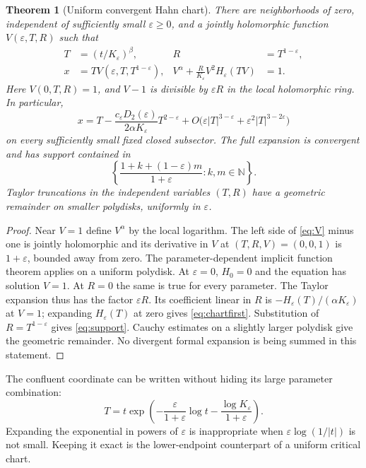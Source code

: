 \documentclass[11pt,a4paper]{article}
\newtheorem{theorem}{Theorem}[section]
\theoremstyle{definition}\newtheorem{definition}[theorem]{Definition}
\theoremstyle{remark}\newtheorem{remark}[theorem]{Remark}
\newcommand{\eps}{\varepsilon}
\newcommand{\N}{\mathbb N}
\newcommand{\1}{\mathbf 1}
\begin{document}
\begin{theorem}[Uniform convergent Hahn chart]\label{thm:chart}
There are neighborhoods of zero, independent of sufficiently small
$\eps\ge0$, and a jointly holomorphic function $V(\eps,T,R)$ such that
\begin{align}
 T&=(t/K_{\eps})^{\beta},& R&=T^{1-\eps},\label{eq:TR}\\
 x&=T V(\eps,T,T^{1-\eps}),&
 V^{\alpha}+\frac R{K_{\eps}}V^2H_{\eps}(TV)&=1.
 \label{eq:V}
\end{align}
Here $V(0,T,R)=1$, and $V-1$ is divisible by $\eps R$ in the local
holomorphic ring. In particular,
\begin{equation}\label{eq:chartfirst}
 x=T-\frac{c_{\eps}D_2(\eps)}{2\alpha K_{\eps}}
                  T^{2-\eps}
    +O\bigl(\eps |T|^{3-\eps}+\eps^2|T|^{3-2\eps}\bigr)
\end{equation}
on every sufficiently small fixed closed subsector. The full expansion
is convergent and has support contained in
\begin{equation}\label{eq:support}
 \left\{\frac{1+k+(1-\eps)m}{1+\eps}:k,m\in\N\right\}.
\end{equation}
Taylor truncations in the independent variables $(T,R)$ have a geometric
remainder on smaller polydisks, uniformly in $\eps$.
\end{theorem}
\begin{proof}
Near $V=1$ define $V^{\alpha}$ by the local logarithm. The left side of
\eqref{eq:V} minus one is jointly holomorphic and its derivative in $V$
at $(T,R,V)=(0,0,1)$ is $1+\eps$, bounded away from zero. The
parameter-dependent implicit function theorem applies on a uniform
polydisk. At $\eps=0$, $H_0=0$ and the equation has solution $V=1$.
At $R=0$ the same is true for every parameter. The Taylor expansion thus
has the factor $\eps R$. Its coefficient linear in $R$ is
$-H_{\eps}(T)/(\alpha K_{\eps})$ at $V=1$; expanding $H_{\eps}(T)$ at
zero gives \eqref{eq:chartfirst}. Substitution of $R=T^{1-\eps}$ gives
\eqref{eq:support}. Cauchy estimates on a slightly larger polydisk give
the geometric remainder. No divergent formal expansion is being summed
in this statement.
\end{proof}

The confluent coordinate can be written without hiding its large
parameter combination:
\begin{equation}\label{eq:confluent}
 T=t\exp\left(-\frac{\eps}{1+\eps}\log t
              -\frac{\log K_{\eps}}{1+\eps}\right).
\end{equation}
Expanding the exponential in powers of $\eps$ is inappropriate when
$\eps\log(1/|t|)$ is not small. Keeping it exact is the lower-endpoint
counterpart of a uniform critical chart.
\end{document}
